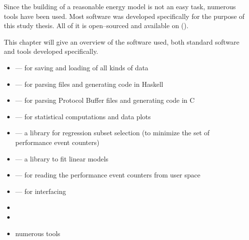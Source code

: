 \label{sec:tools}

Since the building of a reasonable energy model is not an easy task, numerous
tools have been used. Most software was developed specifically for the purpose
of this study thesis. All of it is open--sourced and available on
().

This chapter will give an overview of the software used, both standard software
and tools developed specifically.


\label{sec:standard-software}

\begin{itemize}

\item \JWTLprotobuf{} --- for saving and loading of all kinds of data

\item
{}
{} --- for parsing \JWTprotobuf{} files and generating
code in Haskell

\item {} ---
for parsing Protocol Buffer files and generating code in C

\item \JWTLR{} --- for statistical computations and data plots

\item {}
--- a \JWTR{} library for regression subset selection (to minimize the set of
performance event counters)

\item
{}
{} --- a \JWTR{} library to fit linear models

\item {}
{} --- for reading the performance event counters from user space

\item \JWTLnidaqmxbase{} --- for interfacing \JWPni

\item {}

\item {}

\item numerous  tools

\end{itemize}



